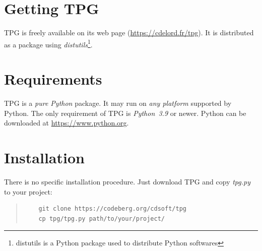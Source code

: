 
\section{Getting TPG}

TPG is freely available on its web page (\url{https://cdelord.fr/tpg}). It is distributed as a package using \emph{distutils}\footnote{distutils is a Python package used to distribute Python softwares}.

\section{Requirements}

TPG is a \emph{pure Python} package.
It may run on \emph{any platform} supported by Python.
The only requirement of TPG is \emph{Python~3.9} or newer. Python can be downloaded at \url{https://www.python.org}.

\section{Installation}

There is no specific installation procedure.
Just download TPG and copy \emph{tpg.py} to your project:
\begin{quote}
\begin{verbatim}
    git clone https://codeberg.org/cdsoft/tpg
    cp tpg/tpg.py path/to/your/project/
\end{verbatim}
\end{quote}
